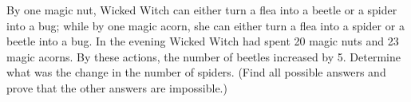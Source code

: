By one magic nut, Wicked Witch can either turn a flea into a beetle or a spider into a bug; while by one magic acorn, she can either turn a flea into a spider or a beetle into a bug. In the evening Wicked Witch had spent 20 magic nuts and 23 magic acorns. By these actions, the number of beetles increased by 5. Determine what was the change in the number of spiders. (Find all possible answers and prove that the other answers are impossible.)